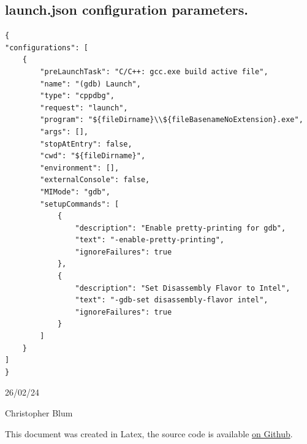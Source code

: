 \documentclass{article}
\begin{document}
\subsection{launch.json configuration parameters.}
\begin{verbatim}
{
"configurations": [
    {   
        "preLaunchTask": "C/C++: gcc.exe build active file",
        "name": "(gdb) Launch",
        "type": "cppdbg",
        "request": "launch",
        "program": "${fileDirname}\\${fileBasenameNoExtension}.exe",
        "args": [],
        "stopAtEntry": false,
        "cwd": "${fileDirname}",
        "environment": [],
        "externalConsole": false,
        "MIMode": "gdb",
        "setupCommands": [
            {
                "description": "Enable pretty-printing for gdb",
                "text": "-enable-pretty-printing",
                "ignoreFailures": true
            },
            {
                "description": "Set Disassembly Flavor to Intel",
                "text": "-gdb-set disassembly-flavor intel",
                "ignoreFailures": true
            }
        ]
    }
]
}
\end{verbatim}

\par
26/02/24\par
Christopher Blum\par
This document was created in Latex, the source code is available \href{https://github.com/PrimaryComet/CSA-VSCode-Setup-Guide}{on Github}.
\end{document}
